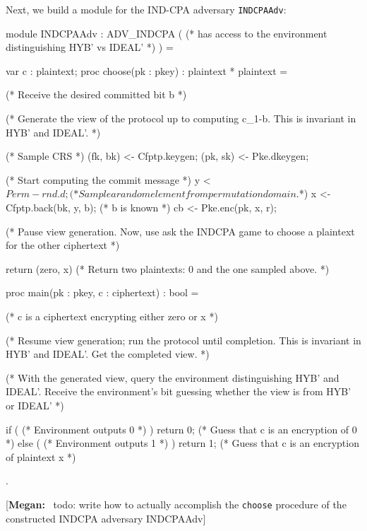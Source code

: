 \documentclass{article}[12pt]
\newcommand{\authnote}[2]{[{\color{red}\textbf{#1:}}~{\color{blue} #2}]}
\newcommand{\authnote}[2]{}
\newcommand{\megan}[1]{\authnote{Megan}{#1}}
\newcommand{\code}[1]{\texttt{#1}} %
\newcommand{\Ideal}{{\mathsf{IDEAL}}}
\newcommand{\Hyb}{{\mathsf{HYB}}}
\begin{document}
Next, we build a module for the IND-CPA adversary \code{INDCPAAdv}:

\begin{easycrypt}[label=code:mod_indcpaadv, caption={Module representing an IND-CPA adversary constructed using an environment that distinguishes the views of $\Hyb'$ and $\Ideal'$}]
module INDCPAAdv : ADV_INDCPA ( (* has access to the environment distinguishing HYB' vs IDEAL' *) ) = {
	var c : plaintext;
	proc choose(pk : pkey) : plaintext * plaintext = {
		(* Receive the desired committed bit b *)

		(* Generate the view of the protocol up to computing c_{1-b}. This is invariant in HYB' and IDEAL'. *)

			(* Sample CRS *)
			(fk, bk) <- Cfptp.keygen;
			(pk, sk) <- Pke.dkeygen;

			(* Start computing the commit message *)
			y <$ Perm-rnd.d;	(* Sample a random element from permutation domain. $*)
			x <- Cfptp.back(bk, y, b); (* b is known *)
			cb <- Pke.enc(pk, x, r);

		(* Pause view generation. Now, use ask the INDCPA game to choose a plaintext for the other ciphertext *)

		return (zero, x)	(* Return two plaintexts: 0 and the one sampled above. *)
	}

	proc main(pk : pkey, c : ciphertext) : bool = { (* c is a ciphertext encrypting either zero or x *)

		(* Resume view generation; run the protocol until completion. This is invariant in HYB' and IDEAL'. Get the completed view. *)

		(* With the generated view, query the environment distinguishing HYB' and IDEAL'. Receive the environment's bit guessing whether the view is from HYB' or IDEAL' *)

		if ( (* Environment outputs 0 *) ) {
			return 0;	(* Guess that c is an encryption of 0 *)
		}
		else ( (* Environment outputs 1 *) ) {
			return 1;	(* Guess that c is an encryption of plaintext x *)
		}

	}
}.
\end{easycrypt}

\megan{todo: write how to actually accomplish the \code{choose} procedure of the constructed INDCPA adversary INDCPAAdv}


{\small{


}}
\end{document}
